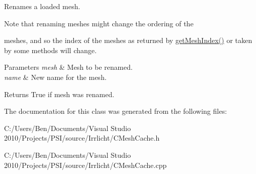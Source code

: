 Renames a loaded mesh. 

\begin{DoxyVerb}Note that renaming meshes might change the ordering of the
\end{DoxyVerb}
 meshes, and so the index of the meshes as returned by \hyperlink{classirr_1_1scene_1_1_c_mesh_cache_a5dae74d158d7283a8c1b42bdc6228407}{get\-Mesh\-Index()} or taken by some methods will change. 
\begin{DoxyParams}{Parameters}
{\em mesh} & Mesh to be renamed. \\
\hline
{\em name} & New name for the mesh. \\
\hline
\end{DoxyParams}
\begin{DoxyReturn}{Returns}
True if mesh was renamed. 
\end{DoxyReturn}


The documentation for this class was generated from the following files\-:\begin{DoxyCompactItemize}
\item 
C\-:/\-Users/\-Ben/\-Documents/\-Visual Studio 2010/\-Projects/\-P\-S\-I/source/\-Irrlicht/C\-Mesh\-Cache.\-h\item 
C\-:/\-Users/\-Ben/\-Documents/\-Visual Studio 2010/\-Projects/\-P\-S\-I/source/\-Irrlicht/C\-Mesh\-Cache.\-cpp\end{DoxyCompactItemize}

